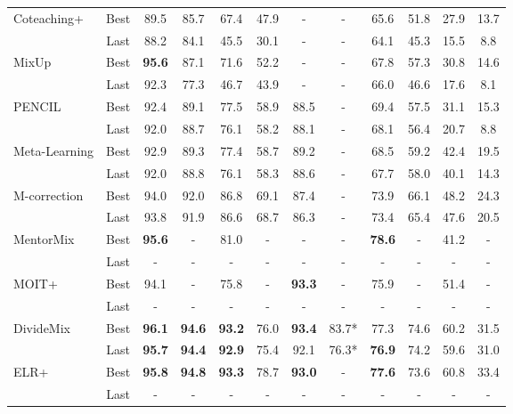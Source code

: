 \documentclass[review]{elsarticle}
\theoremstyle{plain}
\begin{document}
\begin{table*}[t!]
{\begin{tabular}{lc|cccc|cc||cccc}
\multirow{2}{*}{Coteaching+ \citep{yu2019does}} & Best & 89.5 & 85.7 & 67.4& 47.9& - & -&65.6& 51.8 & 27.9 & 13.7\\
    & Last & 88.2 & 84.1 & 45.5& 30.1& - & -&64.1& 45.3 & 15.5 & 8.8\\
\hline
\multirow{2}{*}{MixUp \citep{zhang2017mixup}} &Best & \textbf{95.6} & 87.1 & 71.6& 52.2& - & - & 67.8& 57.3 & 30.8 & 14.6\\
 &Last & 92.3 & 77.3 & 46.7& 43.9& - & - & 66.0& 46.6 & 17.6 & 8.1\\
\hline
\multirow{2}{*}{PENCIL \citep{yi2019probabilistic}}& Best & 92.4 & 89.1 & 77.5& 58.9& 88.5 & - & 69.4& 57.5 & 31.1 & 15.3 \\
  & Last & 92.0 & 88.7 & 76.1& 58.2& 88.1 & - & 68.1& 56.4 & 20.7 & 8.8 \\
\hline
\multirow{2}{*}{Meta-Learning \citep{li2019learning}}&Best & 92.9 & 89.3 & 77.4& 58.7& 89.2 & - & 68.5& 59.2 & 42.4 & 19.5 \\
   &Last & 92.0 & 88.8 & 76.1& 58.3& 88.6 & - & 67.7& 58.0 & 40.1 & 14.3 \\
\hline
\multirow{2}{*}{M-correction \citep{arazo2019unsupervised}}&Best& 94.0 & 92.0 & 86.8& 69.1& 87.4 & - & 73.9& 66.1 & 48.2 & 24.3 \\
   &Last& 93.8 & 91.9 & 86.6& 68.7& 86.3 & - & 73.4& 65.4 & 47.6 & 20.5 \\
\hline
\multirow{2}{*}{MentorMix~\citep{jiang2020beyond}}& Best & \textbf{95.6} & - & 81.0 & - & - & - & \textbf{78.6} & - & 41.2 & - \\
  & Last & - & - & - & - & - & - & - & - & - & - \\
\hline
\multirow{2}{*}{MOIT+~\citep{ortego2020multi}}& Best & 94.1 & - & 75.8 & - & \textbf{93.3} & - & 75.9 & - & 51.4 & - \\
  & Last & - & - & - & - & - & - & - & - & - & - \\
\hline
\multirow{2}{*}{DivideMix \citep{li2020dividemix}}& Best & \textbf{96.1} & \textbf{94.6} & \textbf{93.2} & 76.0& \textbf{93.4} & 83.7* & 77.3 & 74.6 & 60.2 & 31.5 \\
  & Last & \textbf{95.7} & \textbf{94.4} & \textbf{92.9} & 75.4& 92.1 & 76.3* & \textbf{76.9} & 74.2 & 59.6 & 31.0 \\
\hline
\multirow{2}{*}{ELR+~\citep{liu2020early}}& Best & \textbf{95.8} & \textbf{94.8} & \textbf{93.3} & 78.7& \textbf{93.0} & - & \textbf{77.6} & 73.6 & 60.8 & 33.4 \\
  & Last & - & - & - & - & - & - & - & - & - & - \\


\end{tabular}}
\end{table*}
\end{document}
